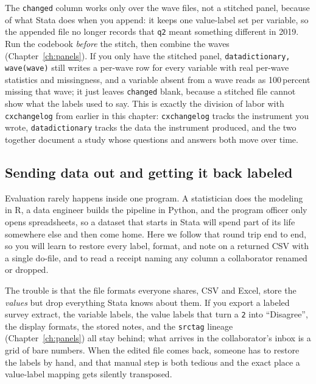 The \texttt{changed} column works only over the wave files, not a stitched panel, because of what Stata does when you append: it keeps one value-label set per variable, so the appended file no longer records that \texttt{q2} meant something different in 2019. Run the codebook \emph{before} the stitch, then combine the waves (Chapter~\ref{ch:panels}). If you only have the stitched panel, \texttt{datadictionary, wave(wave)} still writes a per-wave row for every variable with real per-wave statistics and missingness, and a variable absent from a wave reads as 100\,percent missing that wave; it just leaves \texttt{changed} blank, because a stitched file cannot show what the labels used to say. This is exactly the division of labor with \texttt{cxchangelog} from earlier in this chapter: \texttt{cxchangelog} tracks the instrument you wrote, \texttt{datadictionary} tracks the data the instrument produced, and the two together document a study whose questions and answers both move over time.

\subsection{Sending data out and getting it back labeled}\label{sec:datadictionary-roundtrip}
Evaluation rarely happens inside one program. A statistician does the modeling in R, a data engineer builds the pipeline in Python, and the program officer only opens spreadsheets, so a dataset that starts in Stata will spend part of its life somewhere else and then come home. Here we follow that round trip end to end, so you will learn to restore every label, format, and note on a returned CSV with a single do-file, and to read a receipt naming any column a collaborator renamed or dropped.

The trouble is that the file formats everyone shares, CSV and Excel, store the \emph{values} but drop everything Stata knows about them. If you export a labeled survey extract, the variable labels, the value labels that turn a \texttt{2} into \enquote{Disagree}, the display formats, the stored notes, and the \texttt{srctag} lineage (Chapter~\ref{ch:panels}) all stay behind; what arrives in the collaborator's inbox is a grid of bare numbers. When the edited file comes back, someone has to restore the labels by hand, and that manual step is both tedious and the exact place a value-label mapping gets silently transposed.

